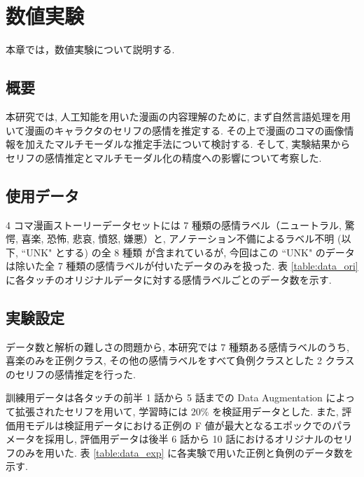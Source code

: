 \newpage
\changeindent{0cm}
\section{数値実験}
\changeindent{2cm}

本章では，数値実験について説明する.

\changeindent{0cm}
\subsection{概要}
\changeindent{2cm}

本研究では, 人工知能を用いた漫画の内容理解のために,
まず自然言語処理を用いて漫画のキャラクタのセリフの感情を推定する.
その上で漫画のコマの画像情報を加えたマルチモーダルな推定手法について検討する.
そして, 実験結果からセリフの感情推定とマルチモーダル化の精度への影響について考察した.

\changeindent{0cm}
\subsection{使用データ}
\changeindent{2cm}

4 コマ漫画ストーリーデータセットには 7 種類の感情ラベル（ニュートラル, 驚愕, 喜楽, 恐怖, 悲哀, 憤怒, 嫌悪）と, アノテーション不備によるラベル不明 (以下, ``UNK" とする) の全 8 種類
が含まれているが, 今回はこの ``UNK" のデータは除いた全 7 種類の感情ラベルが付いたデータのみを扱った. 表 \ref{table:data_ori} に各タッチのオリジナルデータに対する感情ラベルごとのデータ数を示す.

\changeindent{0cm}
\subsection{実験設定}
\changeindent{2cm}

データ数と解析の難しさの問題から, 本研究では 7 種類ある感情ラベルのうち,
喜楽のみを正例クラス, その他の感情ラベルをすべて負例クラスとした
2 クラスのセリフの感情推定を行った.

訓練用データは各タッチの前半 1 話から 5 話までの
Data Augmentation によって拡張されたセリフを用いて, 学習時には $20\%$ を検証用データとした.
また, 評価用モデルは検証用データにおける正例の F 値が最大となるエポックでのパラメータを採用し,
評価用データは後半 6 話から 10 話におけるオリジナルのセリフのみを用いた.
表 \ref{table:data_exp} に各実験で用いた正例と負例のデータ数を示す.



